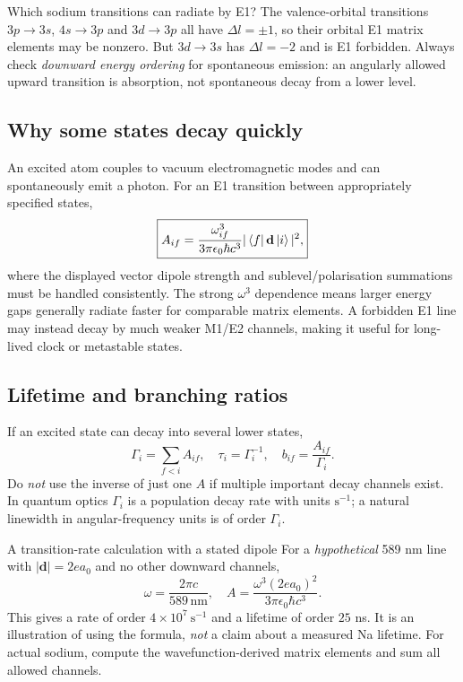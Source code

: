 \begin{worked}{Which sodium transitions can radiate by E1?}
The valence-orbital transitions
\(3p\to3s\), \(4s\to3p\)
and \(3d\to3p\) all have
\(\Delta l=\pm1\), so their
orbital E1 matrix elements may
be nonzero. But \(3d\to3s\)
has \(\Delta l=-2\) and is E1 forbidden.
Always check \emph{downward energy ordering}
for spontaneous emission: an angularly
allowed upward transition is absorption,
not spontaneous decay from a lower level.
\end{worked}

\subsection{Why some states decay quickly}
An excited atom couples to vacuum
electromagnetic modes and can
spontaneously emit a photon. For an
E1 transition between appropriately
specified states,
\[
\boxed{A_{if}=
\frac{\omega_{if}^3}{3\pi\epsilon_0\hbar c^3}
|\left\langle f\right\rvert\mathbf d\left\lvert i\right\rangle|^2,}
\]
where the displayed vector dipole
strength and sublevel/polarisation
summations must be handled consistently.
The strong \(\omega^3\) dependence means
larger energy gaps generally radiate
faster for comparable matrix elements.
A forbidden E1 line may instead decay
by much weaker M1/E2 channels,
making it useful for long-lived
clock or metastable states.

\subsection{Lifetime and branching ratios}
If an excited state can decay into
several lower states,
\[
\boxed{\Gamma_i=\sum_{f<i}A_{if},\quad
\tau_i=\Gamma_i^{-1},\quad
b_{if}=\frac{A_{if}}{\Gamma_i}.}
\]
Do \emph{not} use the inverse
of just one \(A\) if multiple
important decay channels exist.
In quantum optics \(\Gamma_i\)
is a population decay rate with units
\(\mathrm{s}^{-1}\); a natural
linewidth in angular-frequency units
is of order \(\Gamma_i\).

\begin{worked}{A transition-rate calculation with a stated dipole}
For a \emph{hypothetical} 589 nm line with
\(|\mathbf d|=2ea_0\) and no other
downward channels,
\[
\omega=\frac{2\pi c}{589\,\mathrm{nm}},
\quad
A=\frac{\omega^3(2ea_0)^2}
{3\pi\epsilon_0\hbar c^3}.
\]
This gives a rate of order
\(4\times10^7\ \mathrm{s}^{-1}\)
and a lifetime of order
\(25\) ns. It is an illustration
of using the formula, \emph{not}
a claim about a measured Na lifetime.
For actual sodium, compute the
wavefunction-derived matrix elements
and sum all allowed channels.
\end{worked}

